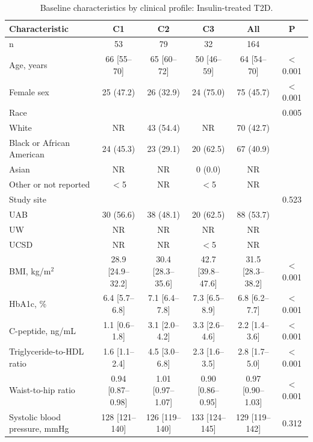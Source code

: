 \begin{table}[htbp]
\centering
\footnotesize
\caption{Baseline characteristics by clinical profile: Insulin-treated T2D.}
\label{tab:baseline-insulin_dependent}
\begin{tabular}{lccccc}
\toprule
Characteristic & C1 & C2 & C3 & All & P \\
\midrule
n & 53 & 79 & 32 & 164 &  \\
Age, years & 66 [55--70] & 65 [60--72] & 50 [46--59] & 64 [54--70] & $<$0.001 \\
Female sex & 25 (47.2) & 26 (32.9) & 24 (75.0) & 75 (45.7) & $<$0.001 \\
Race &  &  &  &  & 0.005 \\
\hspace{1em}White & NR & 43 (54.4) & NR & 70 (42.7) &  \\
\hspace{1em}Black or African American & 24 (45.3) & 23 (29.1) & 20 (62.5) & 67 (40.9) &  \\
\hspace{1em}Asian & NR & NR & 0 (0.0) & NR &  \\
\hspace{1em}Other or not reported & $<$5 & NR & $<$5 & NR &  \\
Study site &  &  &  &  & 0.523 \\
\hspace{1em}UAB & 30 (56.6) & 38 (48.1) & 20 (62.5) & 88 (53.7) &  \\
\hspace{1em}UW & NR & NR & NR & NR &  \\
\hspace{1em}UCSD & NR & NR & $<$5 & NR &  \\
BMI, kg/m$^2$ & 28.9 [24.9--32.2] & 30.4 [28.3--35.6] & 42.7 [39.8--47.6] & 31.5 [28.3--38.2] & $<$0.001 \\
HbA1c, \% & 6.4 [5.7--6.8] & 7.1 [6.4--7.8] & 7.3 [6.5--8.9] & 6.8 [6.2--7.7] & $<$0.001 \\
C-peptide, ng/mL & 1.1 [0.6--1.8] & 3.1 [2.0--4.2] & 3.3 [2.6--4.6] & 2.2 [1.4--3.6] & $<$0.001 \\
Triglyceride-to-HDL ratio & 1.6 [1.1--2.4] & 4.5 [3.0--6.8] & 2.3 [1.6--3.5] & 2.8 [1.7--5.0] & $<$0.001 \\
Waist-to-hip ratio & 0.94 [0.87--0.98] & 1.01 [0.97--1.07] & 0.90 [0.86--0.95] & 0.97 [0.90--1.03] & $<$0.001 \\
Systolic blood pressure, mmHg & 128 [121--140] & 126 [119--140] & 133 [124--145] & 129 [119--142] & 0.312 \\

\end{tabular}
\end{table}
